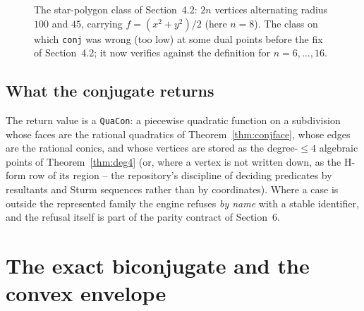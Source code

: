\documentclass[11pt]{article}
\theoremstyle{definition}
\begin{document}
\begin{figure}[t]
\centering
{}
\caption{The star-polygon class of Section~4.2: $2n$ vertices alternating
radius $100$ and $45$, carrying $f=(x^2+y^2)/2$ (here $n=8$). The class on
which \texttt{conj} was wrong (too low) at some dual points before the fix of
Section~4.2; it now verifies against the definition for $n=6,\ldots,16$.
}
\label{fig:star}
\end{figure}

\subsection{What the conjugate returns}

The return value is a \texttt{QuaCon}: a piecewise quadratic function on a
subdivision whose faces are the rational quadratics of
Theorem~\ref{thm:conjface}, whose edges are the rational conics, and whose
vertices are stored as the degree-$\le4$ algebraic points of
Theorem~\ref{thm:deg4} (or, where a vertex is not written down, as the
H-form row of its region -- the repository's discipline of deciding
predicates by resultants and Sturm sequences rather than by coordinates).
Where a
case is outside the represented family the engine refuses \emph{by name} with a
stable identifier, and the refusal itself is part of the parity contract of
Section~6.

\section{The exact biconjugate and the convex envelope}
\end{document}
